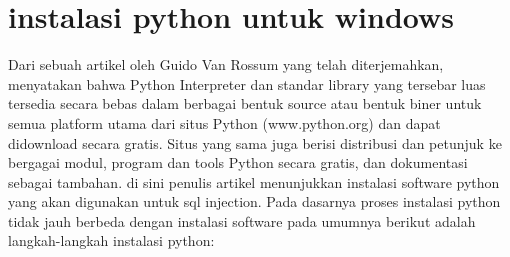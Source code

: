\section {instalasi python untuk windows}

	Dari sebuah artikel oleh Guido Van Rossum yang telah diterjemahkan, menyatakan bahwa Python Interpreter dan standar library 
	yang tersebar luas tersedia secara bebas dalam berbagai bentuk source atau bentuk biner untuk semua platform utama dari situs 
	Python (www.python.org) dan dapat didownload secara gratis. Situs yang sama juga berisi distribusi dan petunjuk ke bergagai 
	modul, program dan tools Python secara gratis, dan dokumentasi sebagai tambahan. \cite {van1995python}
	di sini penulis artikel menunjukkan instalasi software python yang akan
	digunakan untuk sql injection. Pada dasarnya proses instalasi python tidak jauh berbeda dengan instalasi software pada umumnya
	berikut adalah langkah-langkah instalasi python:

